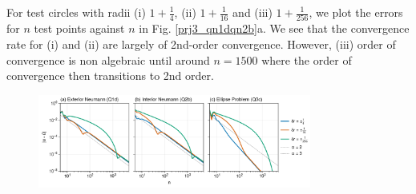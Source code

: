 \begin{enumerate}[label=(\alph*),leftmargin=*,itemsep=0mm]
    For test circles with radii (i) $1+\frac{1}{4}$, (ii) $1+\frac{1}{16}$ and (iii) $1+\frac{1}{256}$, we plot the errors for $n$ test points against $n$ in Fig. \ref{prj3_qn1dqn2b}a.  We see that the convergence rate for (i) and (ii) are largely of 2nd-order convergence.  However, (iii) order of convergence is non algebraic until around $n=1500$ where the order of convergence then transitions to 2nd order.

    \begin{figure}[h!]
    \centering
    \includegraphics[width=0.8\textwidth]{figures/prj3_converge.png}\\
    \caption{}
    \label{prj3_converge}
    \end{figure}
    
\end{enumerate}